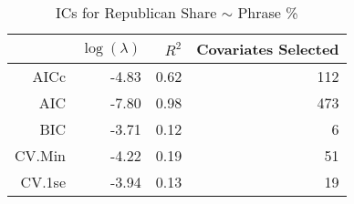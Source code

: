\begin{table}[ht]
\centering
\begin{tabular}{rrrr}
  \hline
 & $\log(\lambda)$ & $R^2$ & Covariates Selected \\ 
  \hline
AICc & -4.83 & 0.62 & 112 \\ 
  AIC & -7.80 & 0.98 & 473 \\ 
  BIC & -3.71 & 0.12 &   6 \\ 
  CV.Min & -4.22 & 0.19 &  51 \\ 
  CV.1se & -3.94 & 0.13 &  19 \\ 
   \hline
\end{tabular}
\caption{ICs for Republican Share $\sim$ Phrase \%} 
\label{tab:repsharex}
\end{table}
